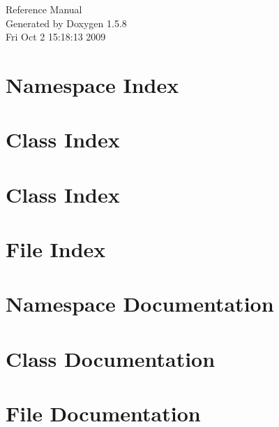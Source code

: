 \documentclass[a4paper]{book}
\begin{document}
\begin{titlepage}
\vspace*{7cm}
\begin{center}
{\Large Reference Manual}\\
\vspace*{1cm}
{\large Generated by Doxygen 1.5.8}\\
\vspace*{0.5cm}
{\small Fri Oct 2 15:18:13 2009}\\
\end{center}
\end{titlepage}
\clearemptydoublepage
{}
\tableofcontents
\clearemptydoublepage
{}
\chapter{Namespace Index}

\chapter{Class Index}

\chapter{Class Index}

\chapter{File Index}

\chapter{Namespace Documentation}

\chapter{Class Documentation}





















\chapter{File Documentation}








\printindex
\end{document}
